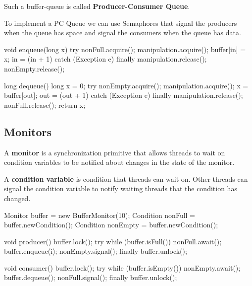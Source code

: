 \begin{definition}
    Such a buffer-queue is called \textbf{Producer-Consumer Queue}.
\end{definition}

\begin{remark}
    To implement a PC Queue we can use Semaphores that signal the producers when the queue has space and signal the consumers when the queue has data.
\end{remark}

\begin{codeexample}
void enqueue(long x) {
    try {
        nonFull.acquire();
        manipulation.acquire();
        buffer[in] = x;
        in = (in + 1) %
    } catch (Exception e) {}
    finally {
        manipulation.release();
        nonEmpty.release();
    }
}
\end{codeexample}

\begin{codeexample}
long dequeue() {
    long x = 0;
    try {
        nonEmpty.acquire();
        manipulation.acquire();
        x = buffer[out];
        out = (out + 1) %
    } catch (Exception e) {}
    finally {
        manipulation.release();
        nonFull.release();
    }
    return x;
}
\end{codeexample}

\subsection{Monitors}

\begin{definition}
    A \textbf{monitor} is a synchronization primitive that allows threads to wait on condition variables to be notified about changes in the state of the monitor.
\end{definition}

\begin{definition}
    A \textbf{condition variable} is condition that threads can wait on. Other threads can signal the condition variable to notify waiting threads that the condition has changed.
\end{definition}

\begin{codeexample}
Monitor buffer = new BufferMonitor(10);
Condition nonFull = buffer.newCondition();
Condition nonEmpty = buffer.newCondition();

void producer() {
    buffer.lock();
    try {
        while (buffer.isFull()) {
            nonFull.await();
        }
        buffer.enqueue(i);
        nonEmpty.signal();
    } finally {
        buffer.unlock();
    }
}

void consumer() {
    buffer.lock();
    try {
        while (buffer.isEmpty()) {
            nonEmpty.await();
        }
        buffer.dequeue();
        nonFull.signal();
    } finally {
        buffer.unlock();
    }
}
\end{codeexample}


